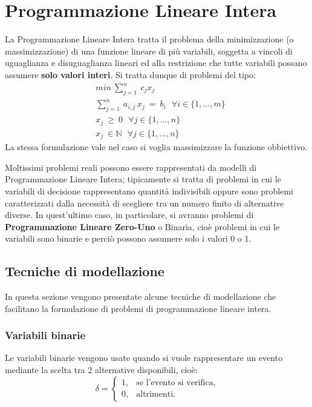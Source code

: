 \section{Programmazione Lineare Intera}
La Programmazione Lineare Intera tratta il problema della minimizzazione (o massimizzazione) di una funzione lineare di più variabili, soggetta a vincoli di uguaglianza e disuguaglianza lineari ed alla restrizione che tutte variabili possano assumere \textbf{solo valori interi}. Si tratta dunque di problemi del tipo:
\begin{equation}
\begin{split}
& min ~ \sum_{j=1}^n ~ c_j x_j \\
& \sum_{j=1}^n ~ a_{i, j} ~ x_j ~ = ~ b_i ~~~ \forall i \in \{1,...,m\} \\
& x_j ~ \geq ~ 0 ~~~ \forall j \in \{1,...,n\} \\
& x_j ~ \in \mathbb{N} ~~~ \forall j \in \{1,...,n\}
\end{split}
\end{equation}
La stessa formulazione vale nel caso si voglia massimizzare la funzione obbiettivo.

Moltissimi problemi reali possono essere rappresentati da modelli di Programmazione Lineare Intera; tipicamente si tratta di problemi in cui le variabili di decisione rappresentano quantità indivisibili oppure sono problemi caratterizzati dalla necessità di scegliere tra un numero finito di alternative diverse. In quest'ultimo caso, in particolare, si avranno problemi di \textbf{Programmazione Lineare Zero-Uno} o Binaria, cioè problemi in cui le variabili sono binarie e perciò possono assumere solo i valori 0 o 1.


\subsection{Tecniche di modellazione}
In questa sezione vengono presentate alcune tecniche di modellazione che facilitano la formulazione di problemi di programmazione lineare intera.

\subsubsection*{Variabili binarie}
Le variabili binarie vengono usate quando si vuole rappresentare un evento mediante la scelta tra 2 alternative disponibili, cioè:
\begin{equation}
\label{eq:varBinarie}
\delta=
\begin{cases}
1, & \text{se l'evento si verifica,} \\
0, & \text{altrimenti.}
\end{cases}
\end{equation}

